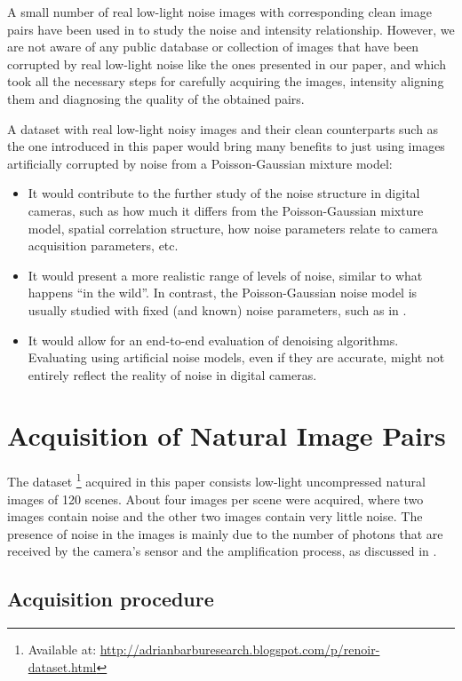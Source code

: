 \documentclass[review]{elsarticle}
\begin{document}
A small number of real low-light noise images with corresponding clean image pairs have been used in \cite{NoiseEstimation} to study the noise and intensity relationship. 
However, we are not aware of any public database or collection of images that have been corrupted by real low-light noise like the ones presented in our paper, and which took all the necessary steps for carefully acquiring the images, intensity aligning them and diagnosing the quality of the obtained pairs.

A dataset with real low-light noisy images and their clean counterparts such as the one introduced in this paper would bring many benefits to just using images artificially corrupted by noise from a Poisson-Gaussian mixture model:
\begin{itemize}
\item It would contribute to the further study of the noise structure in digital cameras, such as how much it differs from the Poisson-Gaussian mixture model, spatial correlation structure, how noise parameters relate to camera acquisition parameters, etc.
\item It would present a more realistic range of levels of noise, similar to what happens ``in the wild''. In contrast, the Poisson-Gaussian noise model is usually studied with fixed (and known) noise parameters, such as in \cite{makitalo2014noise}. 
\item It would allow for an end-to-end evaluation of denoising algorithms. Evaluating using artificial noise models, even if they are accurate, might not entirely reflect the reality of noise in digital cameras.
\end{itemize}


\section{Acquisition of Natural Image Pairs} \label{sec:acq}


The dataset \footnote{Available at: \url{http://adrianbarburesearch.blogspot.com/p/renoir-dataset.html}} acquired in this paper consists low-light uncompressed natural images of 120 scenes. About four images per scene were acquired, where two images contain noise and the other two images contain very little noise. The presence of noise in  the images is mainly due to the number of photons that are received by the camera's sensor and the amplification process, as discussed in \cite{ishii2007denoising}. 

\subsection{Acquisition procedure}
\end{document}
